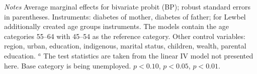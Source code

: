 \begin{table}[p]
\begin{center}
\begin{adjustbox}{max width=\textwidth, center}
\begin{threeparttable}
{\begin{tablenotes}
\item \footnotesize \textit{Notes}  Average marginal effects for bivariate probit (BP); robust standard errors in parentheses. Instruments: diabetes of mother, diabetes of father; for Lewbel additionally created age groups instruments. The models contain the age categories 55--64 with 45--54 as the reference category. Other control variables: region, urban, education, indigenous, marital status, children, wealth, parental education. $^a$ The test statistics are taken from the linear IV model not presented here. Base category is being unemployed.
\sym{*} \(p<0.10\), \sym{**} \(p<0.05\), \sym{***} \(p<0.01\).
\end{tablenotes}
}
\end{threeparttable}
\end{adjustbox}
\end{center}
\end{table}


\clearpage

